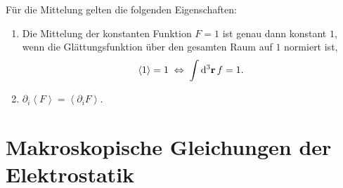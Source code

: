 Für die Mittelung gelten die folgenden Eigenschaften:\begin{enumerate}
	\item Die Mittelung der konstanten Funktion $F=1$ ist genau dann konstant $1$, wenn die Glättungsfunktion über den gesamten Raum auf $1$ normiert ist,
	      \begin{equation*}
		      \left\langle 1\right\rangle =1\equivalence \int \diffa[3]{\vec{r}}f=1.
	      \end{equation*}
	\item $\partial _{i}\left\langle F\right\rangle =\left\langle \partial _{i}F\right\rangle $.
\end{enumerate}



\section{Makroskopische Gleichungen der Elektrostatik\label{sec:Makroskopische_Gleichungen_der_Elektrostatik}}

